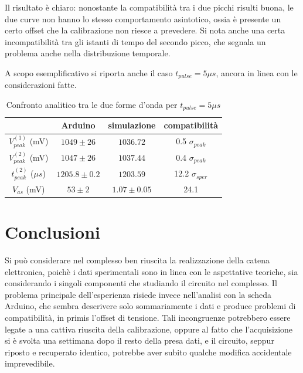 \documentclass{article}
\begin{document}
Il risultato è chiaro: nonostante la compatibilità tra i due picchi risulti buona, le due curve non hanno lo stesso comportamento asintotico, ossia è presente
un certo offset che la calibrazione non riesce a prevedere. Si nota anche una certa incompatibilità tra gli istanti di tempo del secondo picco, che segnala 
un problema anche nella distribuzione temporale.

A scopo esemplificativo si riporta anche il caso $t_{pulse}=5 \mu s$, ancora in linea con le considerazioni fatte.

\begin{table}[H]
    \centering
    \begin{tabular}{cccc}
        \toprule
                        & Arduino & simulazione & compatibilità \\
        \midrule
        $V_{peak}^{(1)}$ (mV)&   $1049 \pm 26$ & $1036.72$ & 0.5 $\sigma_{peak}$\\
        $V_{peak}^{(2)}$ (mV)&   $1047 \pm 26$ & $1037.44$ & 0.4 $\sigma_{peak}$\\
        $t_{peak}^{(2)}$ ($\mu s$)&   $1205.8 \pm 0.2$ & $1203.59$ & 12.2 $\sigma_{sper}$\\
        $V_{as}$       (mV)&   $53 \pm 2$ & $1.07 \pm 0.05$ & 24.1 \\
        \bottomrule
    \end{tabular}
    \caption{Confronto analitico tra le due forme d'onda per $t_{pulse}=5 \mu s$}
\end{table}




\section{Conclusioni}

Si può considerare nel complesso ben riuscita la realizzazione della catena elettronica, poichè i dati sperimentali sono in linea con 
le aspettative teoriche, sia considerando i singoli componenti che studiando il circuito nel complesso. Il problema principale dell'esperienza risiede invece 
nell'analisi con la scheda Arduino, che sembra descrivere solo sommariamente i dati e produce problemi di compatibilità, in primis l'offset di tensione. 
Tali incongruenze potrebbero essere legate a una cattiva riuscita della calibrazione, oppure al fatto che l'acquisizione si è svolta una settimana dopo il resto 
della presa dati, e il circuito, seppur riposto e recuperato identico, potrebbe aver subito qualche modifica accidentale imprevedibile.
\end{document}

